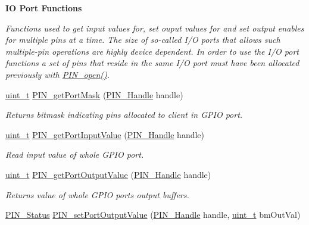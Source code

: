\begin{Indent}{\bf I\+O Port Functions}\par
{\em Functions used to get input values for, set ouput values for and set output enables for multiple pins at a time. The size of so-\/called I/\+O ports that allows such multiple-\/pin operations are highly device dependent. In order to use the I/\+O port functions a set of pins that reside in the same I/\+O port must have been allocated previously with \hyperlink{_p_i_n_8h_a731c5bb641ffeb064579432adfc8dba0}{P\+I\+N\+\_\+open()}. }\begin{DoxyCompactItemize}
\item 
\hyperlink{_p_i_n_8h_a12a1e9b3ce141648783a82445d02b58d}{uint\+\_\+t} \hyperlink{_p_i_n_8h_a9f5b2367253b355909032742a7e6b5e0}{P\+I\+N\+\_\+get\+Port\+Mask} (\hyperlink{_p_i_n_8h_afb2de52b054638f63c39df1f30a0d88d}{P\+I\+N\+\_\+\+Handle} handle)
\begin{DoxyCompactList}\small\item\em Returns bitmask indicating pins allocated to client in G\+P\+I\+O port. \end{DoxyCompactList}\item 
\hyperlink{_p_i_n_8h_a12a1e9b3ce141648783a82445d02b58d}{uint\+\_\+t} \hyperlink{_p_i_n_8h_a726e06dcb7c0d096efaee431ae7b2aaa}{P\+I\+N\+\_\+get\+Port\+Input\+Value} (\hyperlink{_p_i_n_8h_afb2de52b054638f63c39df1f30a0d88d}{P\+I\+N\+\_\+\+Handle} handle)
\begin{DoxyCompactList}\small\item\em Read input value of whole G\+P\+I\+O port. \end{DoxyCompactList}\item 
\hyperlink{_p_i_n_8h_a12a1e9b3ce141648783a82445d02b58d}{uint\+\_\+t} \hyperlink{_p_i_n_8h_ae7dedbfc51ba785bb2f546eed5fdd806}{P\+I\+N\+\_\+get\+Port\+Output\+Value} (\hyperlink{_p_i_n_8h_afb2de52b054638f63c39df1f30a0d88d}{P\+I\+N\+\_\+\+Handle} handle)
\begin{DoxyCompactList}\small\item\em Returns value of whole G\+P\+I\+O port\textquotesingle{}s output buffers. \end{DoxyCompactList}\item 
\hyperlink{_p_i_n_8h_abe0ad59bbf09e51fe37195a5e70b23f6}{P\+I\+N\+\_\+\+Status} \hyperlink{_p_i_n_8h_a380bb69c858753895cf62fb462797fc6}{P\+I\+N\+\_\+set\+Port\+Output\+Value} (\hyperlink{_p_i_n_8h_afb2de52b054638f63c39df1f30a0d88d}{P\+I\+N\+\_\+\+Handle} handle, \hyperlink{_p_i_n_8h_a12a1e9b3ce141648783a82445d02b58d}{uint\+\_\+t} bm\+Out\+Val)

\end{DoxyCompactItemize}
\end{Indent}
